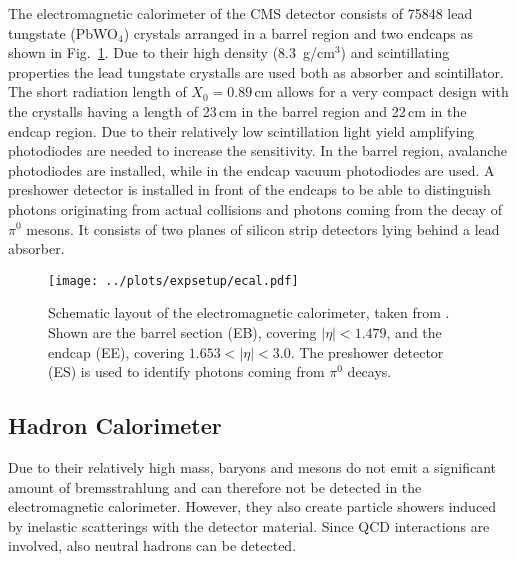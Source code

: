 \noindent The electromagnetic calorimeter of the CMS detector consists of 75848 lead tungstate (PbWO$_4$) crystals arranged in a barrel region and two endcaps as shown in Fig.~\ref{fig:expsetup:ecal}. Due to their high density (8.3\, g/cm$^3$) and scintillating properties the lead tungstate crystalls are used both as absorber and scintillator. The short radiation length of $X_0=0.89$\,cm allows for a very compact design with the crystalls having a length of 23\,cm in the barrel region and 22\,cm in the endcap region. Due to their relatively low scintillation light yield amplifying photodiodes are needed to increase the sensitivity. In the barrel region, avalanche photodiodes are installed, while in the endcap vacuum photodiodes are used. A preshower detector is installed in front of the endcaps to be able to distinguish photons originating from actual collisions and photons coming from the decay of $\pi^0$ mesons. It consists of two planes of silicon strip detectors lying behind a lead absorber.
\begin{figure}
    \centering
    \texttt{[image: ../plots/expsetup/ecal.pdf]}
    \caption[Schematic layout of the electromagnetic calorimeter]{Schematic layout of the electromagnetic calorimeter, taken from \cite{CMS_design}. Shown are the barrel section (EB), covering $|\eta|<1.479$, and the endcap (EE), covering $1.653<|\eta|<3.0$. The preshower detector (ES) is used to identify photons coming from $\pi^0$ decays.}
    \label{fig:expsetup:ecal}
\end{figure}
\subsection*{Hadron Calorimeter}
Due to their relatively high mass, baryons and mesons do not emit a significant amount of bremsstrahlung and can therefore not be detected in the electromagnetic calorimeter. However, they also create particle showers induced by inelastic scatterings with the detector material. Since QCD interactions are involved, also neutral hadrons can be detected.\\

